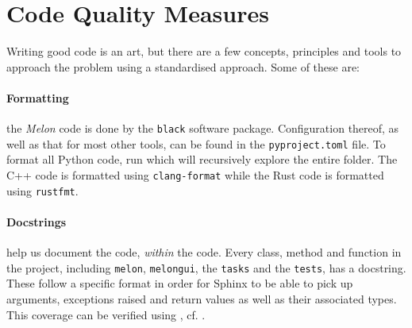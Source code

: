 \section{Code Quality Measures}
Writing good code is an art, but there are a few concepts, principles and tools to approach the problem using a standardised approach.
Some of these are:

\paragraph{Formatting} the \textit{Melon} code is done by the \texttt{black} software package. Configuration thereof, as well as that for most other tools, can be found in the \texttt{pyproject.toml} file. To format all Python code, run  which will recursively explore the entire folder. The C++ code is formatted using \texttt{clang-format} while the Rust code is formatted using \texttt{rustfmt}.

\paragraph{Docstrings} help us document the code, \textit{within} the code. Every class, method and function in the project, including \texttt{melon}, \texttt{melongui}, the \texttt{tasks} and the \texttt{tests}, has a docstring.
These follow a specific format in order for Sphinx to be able to pick up arguments, exceptions raised and return values as well as their associated types.
This coverage can be verified using , cf. .

